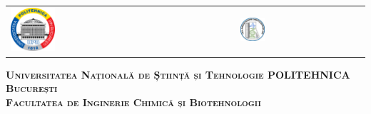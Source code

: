 



\begin{titlepage}
	\centering
	\begin{tabular}{p{6cm}p{3.3cm}}
		\includegraphics[width=0.2\textwidth]{img/upb.png} &
		\includegraphics[width=0.2\textwidth]{img/ficb.jpg}
	\end{tabular}
	\vspace{1cm}

	{\scshape\Large \textbf{Universitatea Națională de Știință și Tehnologie POLITEHNICA București} \\}
	{\scshape\Large \textbf{Facultatea de Inginerie Chimică și Biotehnologii} \\}
	
\end{titlepage}

